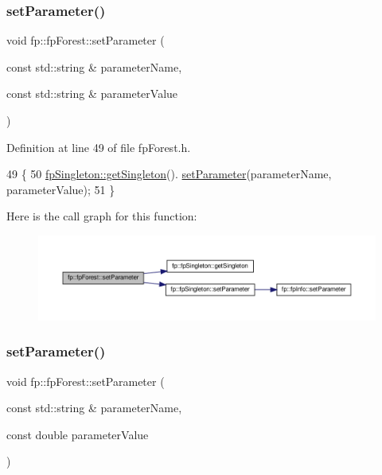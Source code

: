 \subsubsection{\texorpdfstring{set\+Parameter()}{setParameter()}\hspace{0.1cm}{\footnotesize\ttfamily [1/3]}}
{\footnotesize\ttfamily void fp\+::fp\+Forest\+::set\+Parameter (\begin{DoxyParamCaption}\item[{const std\+::string \&}]{parameter\+Name,  }\item[{const std\+::string \&}]{parameter\+Value }\end{DoxyParamCaption})\hspace{0.3cm}{\ttfamily [inline]}}



Definition at line 49 of file fp\+Forest.\+h.


\begin{DoxyCode}
49                                                                                                      \{
50                 \hyperlink{classfp_1_1fpSingleton_a8bdae77b68521003e3fc630edec2e240}{fpSingleton::getSingleton}().
      \hyperlink{classfp_1_1fpSingleton_a90f275b256694ea7b16577d547a33044}{setParameter}(parameterName, parameterValue);    
51             \}
\end{DoxyCode}
Here is the call graph for this function\+:
\nopagebreak
\begin{figure}[H]
\begin{center}
\leavevmode
\includegraphics[width=350pt]{classfp_1_1fpForest_ad13bbbd33291ef5f523691eccc23aece_cgraph}
\end{center}
\end{figure}
\mbox{\label{classfp_1_1fpForest_afc7a14e083aaae0dbd90ef0a30c48c21}} 
\subsubsection{\texorpdfstring{set\+Parameter()}{setParameter()}\hspace{0.1cm}{\footnotesize\ttfamily [2/3]}}
{\footnotesize\ttfamily void fp\+::fp\+Forest\+::set\+Parameter (\begin{DoxyParamCaption}\item[{const std\+::string \&}]{parameter\+Name,  }\item[{const double}]{parameter\+Value }\end{DoxyParamCaption})\hspace{0.3cm}{\ttfamily [inline]}}



